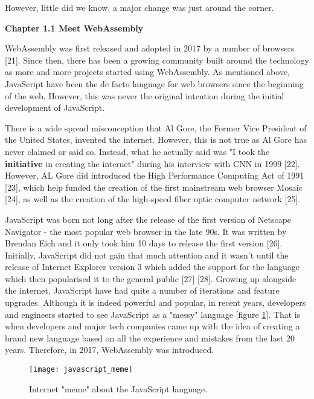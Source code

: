 However, little did we know, a major change was just around the corner.
 
\bigskip
\bigskip

\textbf{{\Large Chapter 1.1 Meet WebAssembly}}

\bigskip

WebAssembly was first released and adopted in 2017 by a number of browsers [21]. Since then, there has been a growing community built around the technology as more and more projects started using WebAssembly. As mentioned above, JavaScript have been the de facto language for web browsers since the beginning of the web. However, this was never the original intention during the initial development of JavaScript.

There is a wide spread misconception that Al Gore, the Former Vice President of the United States, invented the internet. However, this is not true as Al Gore has never claimed or said so. Instead, what he actually said was "I took the \textbf{initiative} in creating the internet" during his interview with CNN in 1999 [22]. However, AL Gore did introduced the High Performance Computing Act of 1991 [23], which help funded the creation of the first mainstream web browser Mosaic [24], as well as the creation of the high-speed fiber optic computer network [25].

JavaScript was born not long after the release of the first version of Netscape Navigator - the most popular web browser in the late 90s. It was written by Brendan Eich and it only took him 10 days to release the first version [26]. Initially, JavaScript did not gain that much attention and it wasn't until the release of Internet Explorer version 3 which added the support for the language which then popularised it to the general public [27] [28]. Growing up alongside the internet, JavaScript have had quite a number of iterations and feature upgrades. Although it is indeed powerful and popular, in recent years, developers and engineers started to see JavaScript as a "messy" language [figure \ref{fig:javascript_meme}]. That is when developers and major tech companies came up with the idea of creating a brand new language based on all the experience and mistakes from the last 20 years. Therefore, in 2017, WebAssembly was introduced.

\newpage

\begin{figure}[hp]
\centering
\texttt{[image: javascript\_meme]}
\caption{\footnotesize{Internet "meme" about the JavaScript language.}}
\captionsetup{aboveskip=0pt,font=it}
\label{fig:javascript_meme}
\end{figure}

